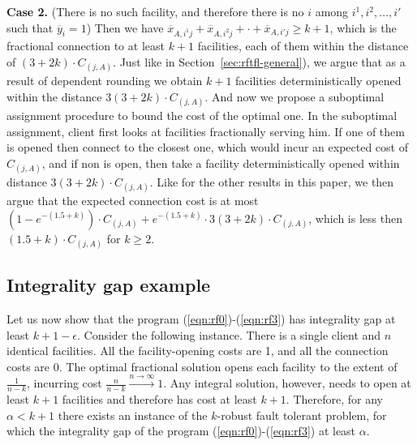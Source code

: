 \documentclass[11pt]{article}
\begin{document}
\smallskip \noindent
{\bf Case 2.} (There is no such facility, 
and therefore there is no $i$ among $i^1, i^2, \ldots, i'$ such that $\overline{y}_i = 1$)
Then we have $\overline{x}_{A,i^1j} + \overline{x}_{A,i^2j} + \cdot + \overline{x}_{A,i'j} \geq k+1$,
which is the fractional connection to at least $k+1$ facilities, each of them
within the distance of $(3+2k) \cdot C_{(j,A)}$. Just like in Section~\ref{sec:rftfl-general}),
we argue that as a result of dependent rounding we obtain $k+1$ facilities 
deterministically opened within the distance $3(3+2k)\cdot C_{(j,A)}$.
And now we propose a suboptimal assignment procedure to bound the cost of the optimal one.
In the suboptimal assignment, client first looks at facilities fractionally serving
him. If one of them is opened then connect to the closest one, which would 
incur an expected cost of $C_{(j,A)}$, and if non is open, then take a facility
deterministically opened within distance $3(3+2k)\cdot C_{(j,A)}$.
Like for the other results in this paper, we then argue that the expected connection cost is 
at most $(1-e^{-(1.5+k)})\cdot C_{(j,A)} + e^{-(1.5+k)}\cdot3(3+2k)\cdot C_{(j,A)}$,
which is less then $(1.5 + k) \cdot C_{(j,A)}$ for $k\geq2$.

\subsection{Integrality gap example}
Let us now show that the program (\ref{eqn:rf0})-(\ref{eqn:rf3})
has integrality gap at least $k+1-\epsilon$.
Consider the following instance. There is a single client
and $n$ identical facilities. All the facility-opening costs are 1,
and all the connection costs are 0.
The optimal fractional solution opens each facility 
to the extent of $\frac{1}{n-k}$, 
incurring cost $\frac{n}{n-k} \stackrel{n \to \infty}{\rightarrow} 1$.
Any integral solution, however, needs to open at least $k+1$ facilities
and therefore has cost at least $k+1$.
Therefore, for any $\alpha < k+1$ there exists an instance of the $k$-robust fault tolerant problem, for which the integrality gap of the 
program (\ref{eqn:rf0})-(\ref{eqn:rf3}) at least $\alpha$.
\end{document}
